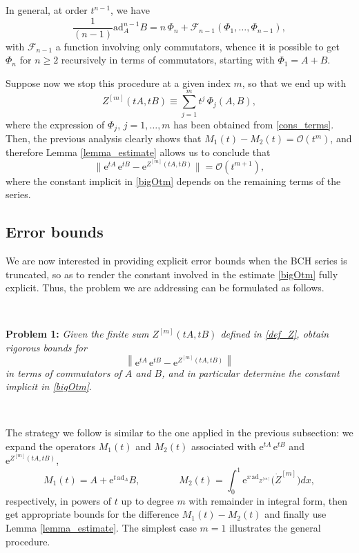 \documentclass[11pt]{article}
\newcommand{\e}{\ensuremath{\mathrm{e}}}
\newcommand{\ad}{\ensuremath{\mathrm{ad}}}
\begin{document}
In general, at order $t^{n-1}$,  we have
\begin{equation} \label{cons_terms}
  \frac{1}{(n-1)} \ad_A^{n-1} B = n \, \Phi_n + \mathcal{F}_{n-1}(\Phi_1, \ldots, \Phi_{n-1}),
\end{equation}
with $\mathcal{F}_{n-1}$ a function involving only commutators, 
whence it is possible to get $\Phi_n$ for $n \ge 2$  recursively in terms of commutators, starting with $\Phi_1 = A + B$. 

Suppose now we stop this procedure at a given index $m$, so that we end up with 
\begin{equation} \label{def_Z}   
   Z^{[m]}(tA, tB) \equiv \sum_{j=1}^m t^j \, \Phi_j(A,B),
\end{equation}
where the expression of $\Phi_j$, $j=1, \ldots, m$ has been obtained from \eqref{cons_terms}. Then, the previous analysis clearly shows that
$M_1(t) - M_2(t) = \mathcal{O}(t^m)$, and therefore  Lemma \ref{lemma_estimate} allows us to conclude that
 \begin{equation} \label{bigOtm}
  \| \e^{t A} \, \e^{t B} - \e^{Z^{[m]}(tA, tB) } \| = \mathcal{O}(t^{m+1}),
\end{equation}
where the constant implicit in \eqref{bigOtm} depends on the remaining terms of the series.

\subsection{Error bounds}

We are now interested in providing explicit error bounds when the BCH series is truncated, so as to render the constant involved in the estimate
\eqref{bigOtm} fully explicit. Thus, the problem we are addressing can be formulated as follows.

\

\noindent
\textbf{Problem 1:} \emph{Given the finite sum $Z^{[m]}(tA, tB)$ defined in \eqref{def_Z}, obtain rigorous bounds for
 \[
     \left\| \e^{t A} \, \e^{t B} - \e^{Z^{[m]}(tA, tB) } \right\| 
 \]
 in terms of commutators of $A$ and $B$, and in particular determine the constant implicit in  \eqref{bigOtm}}. 
  
 \
 
 The strategy we follow is similar to the one applied in the previous subsection: we expand the operators $M_1(t)$ and $M_2(t)$
 associated with $ \e^{t A} \, \e^{t B}$ and $\e^{Z^{[m]}(tA, tB) }$, 
 \begin{equation} \label{M1M2_trunc}
   M_1(t) = A + \e^{t \, \ad_{A}} B, \qquad\qquad  M_2(t) = \int_0^1 \e^{x \, \ad_{Z^{[m]}}} \big(\dot{Z}^{[m]}\big) dx,
 \end{equation}
 respectively, in powers of $t$ up to degree $m$ with remainder in integral form,
then get appropriate bounds for the difference $M_1(t) - M_2(t)$ and finally use Lemma \ref{lemma_estimate}. The simplest case $m=1$ illustrates the
 general procedure.
 
\end{document}
